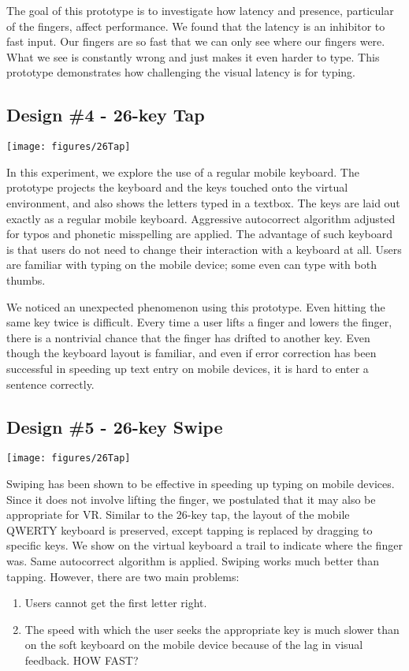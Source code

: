 The goal of this prototype is to investigate how latency and presence, particular of the fingers, affect performance.  We found that the latency is an inhibitor to fast input.  Our fingers are so fast that we can only see where our fingers were.  What we see is constantly wrong and just makes it even harder to type.  This prototype demonstrates how challenging the visual latency is for typing. 

\subsection{Design \#4 - 26-key Tap}
\vspace*{.1cm}
\texttt{[image: figures/26Tap]}

In this experiment, we explore the use of a regular mobile keyboard.  The prototype projects the keyboard and the keys touched onto the virtual environment, and also shows the letters typed in a textbox.  The keys are laid out exactly as a regular mobile keyboard. 
Aggressive autocorrect algorithm adjusted for typos and phonetic misspelling are applied.
The advantage of such keyboard is that users do not need to change their interaction with a keyboard at all.  Users are familiar with typing on the mobile device; some even can type with both thumbs.  

We noticed an unexpected phenomenon using this prototype.  Even hitting the same key twice is difficult.  Every time a user lifts a finger and lowers the finger, there is a nontrivial chance that the finger has drifted to another key.  Even though the keyboard layout is familiar, and even if error correction has been successful in speeding up text entry on mobile devices, it is hard to enter a sentence correctly.   

\subsection{Design \#5 - 26-key Swipe}
\vspace*{.1cm}
\texttt{[image: figures/26Tap]}

Swiping has been shown to be effective in speeding up typing on mobile devices.  Since it does not involve lifting the finger, we postulated that it may also be appropriate for VR.  
Similar to the 26-key tap, the layout of the mobile QWERTY keyboard is preserved, except tapping is replaced by dragging to specific keys.  We show on the virtual keyboard a trail to indicate where the finger was.  Same autocorrect algorithm is applied.   Swiping works much better than tapping.  However, there are two main problems: 
\begin{enumerate}
\item
Users cannot get the first letter right. 
\item
The speed with which the user seeks the appropriate key is much slower than on the soft keyboard on the mobile device because of the lag in visual feedback. 
HOW FAST? 
\end{enumerate}

